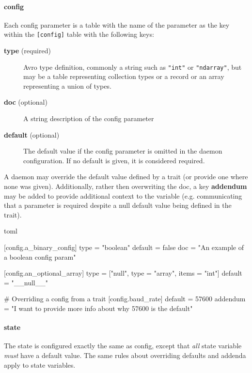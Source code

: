 \hypertarget{config}{%
\paragraph{config}\label{config}}

Each config parameter is a table with the name of the parameter as the
key within the \texttt{{[}config{]}} table with the following keys:

\begin{description}
\item[\textbf{type} (required)]
Avro type definition, commonly a string such as \texttt{"int"} or
\texttt{"ndarray"}, but may be a table representing collection types or
a record or an array representing a union of types.
\item[\textbf{doc} (optional)]
A string description of the config parameter
\item[\textbf{default} (optional)]
The default value if the config parameter is omitted in the daemon
configuration. If no default is given, it is considered required.
\end{description}

A daemon may override the default value defined by a trait (or provide
one where none was given). Additionally, rather then overwriting the
doc, a key \textbf{addendum} may be added to provide additional context
to the variable (e.g. communicating that a parameter is required despite
a null default value being defined in the trait).

\begin{codefragment}{toml}\noop
[config]

[config.a_binary_config]
type = "boolean"
default = false
doc = "An example of a boolean config param"

[config.an_optional_array]
type = ["null", {type = "array", items = "int"}]
default = "__null__"

# Overriding a config from a trait
[config.baud_rate]
default = 57600
addendum = "I want to provide more info about why 57600 is the default"
\end{codefragment}

\hypertarget{state}{%
\paragraph{state}\label{state}}

The state is configured exactly the same as config, except that
\emph{all} state variable \emph{must} have a default value. The same
rules about overriding defaults and addenda apply to state variables.

